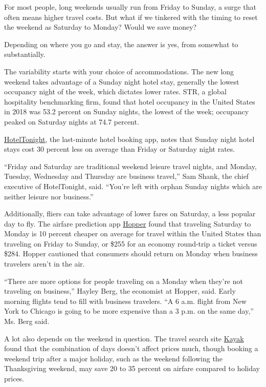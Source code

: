 For most people, long weekends usually run from Friday to Sunday, a
surge that often means higher travel costs. But what if we tinkered with
the timing to reset the weekend as Saturday to Monday? Would we save
money?

Depending on where you go and stay, the answer is yes, from somewhat to
substantially.

The variability starts with your choice of accommodations. The new long
weekend takes advantage of a Sunday night hotel stay, generally the
lowest occupancy night of the week, which dictates lower rates. STR, a
global hospitality benchmarking firm, found that hotel occupancy in the
United States in 2018 was 53.2 percent on Sunday nights, the lowest of
the week; occupancy peaked on Saturday nights at 74.7 percent.

\href{https://www.hoteltonight.com/}{HotelTonight}, the last-minute
hotel booking app, notes that Sunday night hotel stays cost 30 percent
less on average than Friday or Saturday night rates.

``Friday and Saturday are traditional weekend leisure travel nights, and
Monday, Tuesday, Wednesday and Thursday are business travel,'' Sam
Shank, the chief executive of HotelTonight, said. ``You're left with
orphan Sunday nights which are neither leisure nor business.''

Additionally, fliers can take advantage of lower fares on Saturday, a
less popular day to fly. The airfare prediction app
\href{https://www.hopper.com/}{Hopper} found that traveling Saturday to
Monday is 10 percent cheaper on average for travel within the United
States than traveling on Friday to Sunday, or \$255 for an economy
round-trip a ticket versus \$284. Hopper cautioned that consumers should
return on Monday when business travelers aren't in the air.

``There are more options for people traveling on a Monday when they're
not traveling on business,'' Hayley Berg, the economist at Hopper, said.
Early morning flights tend to fill with business travelers. ``A 6 a.m.
flight from New York to Chicago is going to be more expensive than a 3
p.m. on the same day,'' Ms. Berg said.

A lot also depends on the weekend in question. The travel search site
\href{https://www.kayak.com/}{Kayak} found that the combination of days
doesn't affect prices much, though booking a weekend trip after a major
holiday, such as the weekend following the Thanksgiving weekend, may
save 20 to 35 percent on airfare compared to holiday prices.

